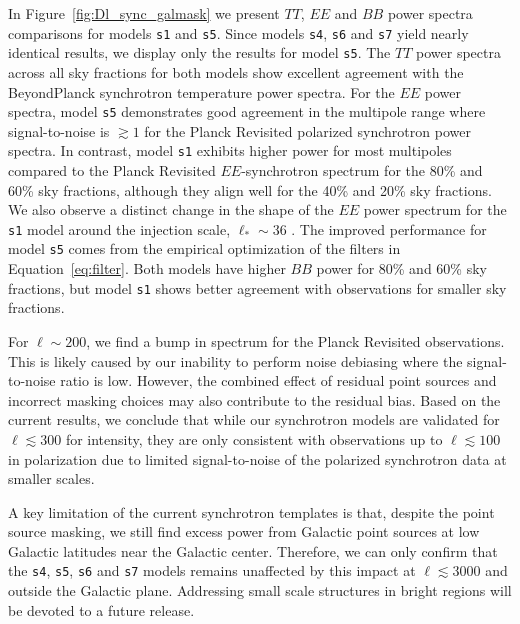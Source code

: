 \documentclass[twocolumn]{aastex631}
\begin{document}
In Figure~\ref{fig:Dl_sync_galmask} we present $TT$, $EE$ and $BB$ power spectra comparisons for models \texttt{s1} and \texttt{s5}. Since models \texttt{s4}, \texttt{s6} and \texttt{s7} yield nearly identical results, we display only the results for model \texttt{s5}. The $TT$ power spectra across all sky fractions for both models show excellent agreement with the BeyondPlanck synchrotron temperature power spectra. For the $EE$ power spectra, model \texttt{s5} demonstrates good agreement in the multipole range where signal-to-noise is $\gtrsim 1$ for the Planck Revisited polarized synchrotron power spectra. In contrast, model \texttt{s1} exhibits higher power for most multipoles compared to the Planck Revisited $EE$-synchrotron spectrum for the 80\% and 60\% sky fractions, although they align well for the 40\% and 20\% sky fractions. We also observe a distinct change in the shape of the $EE$ power spectrum for the \texttt{s1} model around the injection scale, $\ell_*\sim 36$ \citep{Thorne:2017}. The improved performance for model \texttt{s5} comes from the empirical optimization of the filters in Equation~\eqref{eq:filter}. Both models have higher $BB$ power for 80\% and 60\% sky fractions, but model \texttt{s1} shows better agreement with observations for smaller sky fractions.

For $\ell \sim 200$, we find a bump in spectrum for the Planck Revisited observations. This is likely caused by our inability to perform noise debiasing where the signal-to-noise ratio is low. However, the combined effect of residual point sources and incorrect masking choices may also contribute to the residual bias. Based on the current results, we conclude that while our synchrotron models are validated for $\ell \lesssim 300$ for intensity, they are only consistent with observations up to $\ell \lesssim 100$ in polarization due to limited signal-to-noise of the polarized synchrotron data at smaller scales.

A key limitation of the current synchrotron templates is that, despite the point source masking, we still find excess power from Galactic point sources at low Galactic latitudes near the Galactic center. Therefore, we can only confirm that the \texttt{s4}, \texttt{s5}, \texttt{s6} and \texttt{s7} models remains unaffected by this impact at $\ell \lesssim 3000$ and outside the Galactic plane. Addressing small scale structures in bright regions will be devoted to a future release. 
\end{document}
